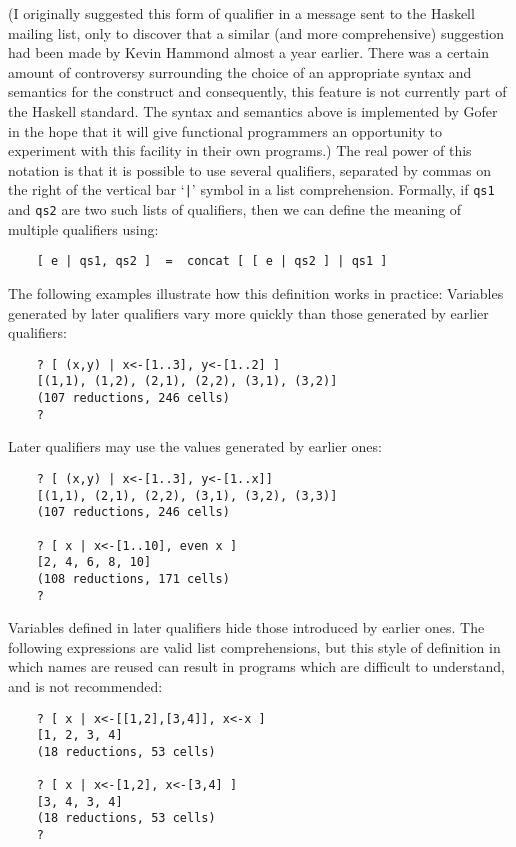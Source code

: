      (I originally suggested this form of qualifier in a message
     sent to the Haskell mailing list, only to discover that a  similar
     (and more comprehensive) suggestion had been made by Kevin Hammond
     almost a year earlier.  There was a certain amount of  controversy
     surrounding the choice of an appropriate syntax and semantics  for
     the construct and consequently, this feature is not currently part
     of the Haskell  standard.   The  syntax  and  semantics  above  is
     implemented by Gofer in the hope  that  it  will  give  functional
     programmers an opportunity to experiment  with  this  facility  in
     their own programs.)
\EI
The real power of this notation is that it is possible to  use  several
qualifiers, separated by commas on the right of the  vertical  bar  `\verb"|"'
symbol in a list comprehension.  Formally, if \verb"qs1" and \verb"qs2" 
are two  such
lists of qualifiers,  then  we  can  define  the  meaning  of  multiple
qualifiers using:
\begin{verbatim}
    [ e | qs1, qs2 ]  =  concat [ [ e | qs2 ] | qs1 ]
\end{verbatim}
The  following  examples  illustrate  how  this  definition  works   in
practice:
\BI
\IT  Variables generated by later qualifiers  vary  more  quickly  than
     those generated by earlier qualifiers:
\begin{verbatim}
    ? [ (x,y) | x<-[1..3], y<-[1..2] ]
    [(1,1), (1,2), (2,1), (2,2), (3,1), (3,2)]
    (107 reductions, 246 cells)
    ?
\end{verbatim}
\IT  Later qualifiers may use the values generated by earlier ones:
\begin{verbatim}
    ? [ (x,y) | x<-[1..3], y<-[1..x]]
    [(1,1), (2,1), (2,2), (3,1), (3,2), (3,3)]
    (107 reductions, 246 cells)

    ? [ x | x<-[1..10], even x ]
    [2, 4, 6, 8, 10]
    (108 reductions, 171 cells)
    ?
\end{verbatim}
\IT  Variables defined in later qualifiers  hide  those  introduced  by
     earlier  ones.   The  following   expressions   are   valid   list
     comprehensions, but this style of definition in  which  names  are
     reused can result in programs which are difficult  to  understand,
     and is not recommended:
\begin{verbatim}
    ? [ x | x<-[[1,2],[3,4]], x<-x ]
    [1, 2, 3, 4]
    (18 reductions, 53 cells)

    ? [ x | x<-[1,2], x<-[3,4] ]
    [3, 4, 3, 4]
    (18 reductions, 53 cells)
    ?
\end{verbatim}
